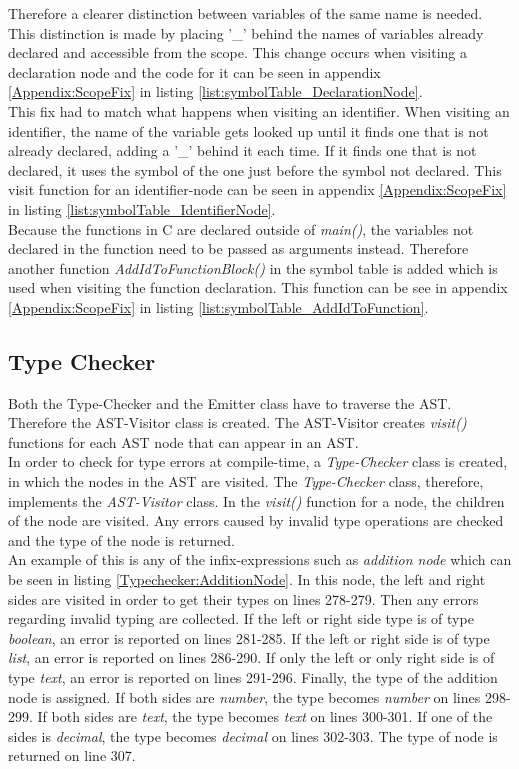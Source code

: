 Therefore a clearer distinction between variables of the same name is needed. This distinction is made by placing '\_' behind the names of variables already declared and accessible from the scope. This change occurs when visiting a declaration node and the code for it can be seen in appendix \ref{Appendix:ScopeFix} in listing \ref{list:symbolTable_DeclarationNode}. \\

This fix had to match what happens when visiting an identifier. When visiting an identifier, the name of the variable gets looked up until it finds one that is not already declared, adding a '\_' behind it each time. If it finds one that is not declared, it uses the symbol of the one just before the symbol not declared. This visit function for an identifier-node can be seen in appendix \ref{Appendix:ScopeFix} in listing \ref{list:symbolTable_IdentifierNode}.\\

Because the functions in C are declared outside of \textit{main()}, the variables not declared in the function need to be passed as arguments instead. Therefore another function \textit{AddIdToFunctionBlock()} in the symbol table is added which is used when visiting the function declaration. This function can be see in appendix \ref{Appendix:ScopeFix} in listing \ref{list:symbolTable_AddIdToFunction}.

\subsection{Type Checker}
Both the Type-Checker and the Emitter class have to traverse the AST. Therefore the AST-Visitor class is created. The AST-Visitor creates \textit{visit()} functions for each AST node that can appear in an AST.\\

In order to check for type errors at compile-time, a \textit{Type-Checker} class is created, in which the nodes in the AST are visited. The \textit{Type-Checker} class, therefore, implements the \textit{AST-Visitor} class. In the \textit{visit()} function for a node, the children of the node are visited. Any errors caused by invalid type operations are checked and the type of the node is returned. \\

An example of this is any of the infix-expressions such as \textit{addition node} which can be seen in listing \ref{Typechecker:AdditionNode}. In this node, the left and right sides are visited in order to get their types on lines 278-279. Then any errors regarding invalid typing are collected. If the left or right side type is of type \textit{boolean}, an error is reported on lines 281-285. If the left or right side is of type \textit{list}, an error is reported on lines 286-290. If only the left or only right side is of type \textit{text}, an error is reported on lines 291-296. Finally, the type of the addition node is assigned. If both sides are \textit{number}, the type becomes \textit{number} on lines 298-299. If both sides are \textit{text}, the type becomes \textit{text} on lines 300-301. If one of the sides is \textit{decimal}, the type becomes \textit{decimal} on lines 302-303. The type of node is returned on line 307.


